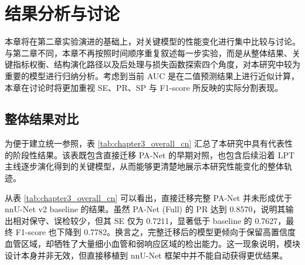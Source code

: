 \documentclass[a4paper,12pt]{article}
\begin{document}
\section{结果分析与讨论}

本章将在第二章实验演进的基础上，对关键模型的性能变化进行集中比较与讨论。与第二章不同，本章不再按照时间顺序重复叙述每一步实验，而是从整体结果、关键指标权衡、结构演化路径以及后处理与损失函数探索四个角度，对本研究中较为重要的模型进行归纳分析。考虑到当前 AUC 是在二值预测结果上进行近似计算，本章在讨论时将更加重视 SE、PR、SP 与 F1-score 所反映的实际分割表现。

\subsection{整体结果对比}

为便于建立统一参照，表 \ref{tab:chapter3_overall_cn} 汇总了本研究中具有代表性的阶段性结果。该表既包含直接迁移 PA-Net 的早期对照，也包含后续沿着 LPT 主线逐步演化得到的关键模型，从而能够更清楚地展示本研究性能变化的整体轨迹。

\begin{table}[htbp]
\centering
\caption{第三章代表性模型整体结果对比}
\label{tab:chapter3_overall_cn}
\end{table}

从表 \ref{tab:chapter3_overall_cn} 可以看出，直接迁移完整 PA-Net 并未形成优于 nnU-Net v2 baseline 的结果。虽然 PA-Net (Full) 的 PR 达到 0.8570，说明其输出相对保守、误检较少，但其 SE 仅为 0.7211，显著低于 baseline 的 0.7627，最终 F1-score 也下降到 0.7782。换言之，完整迁移后的模型更倾向于保留高置信度血管区域，却牺牲了大量细小血管和弱响应区域的检出能力。这一现象说明，模块设计本身并非无效，但直接移植到 nnU-Net 框架中并不能自动获得更优结果。
\end{document}

